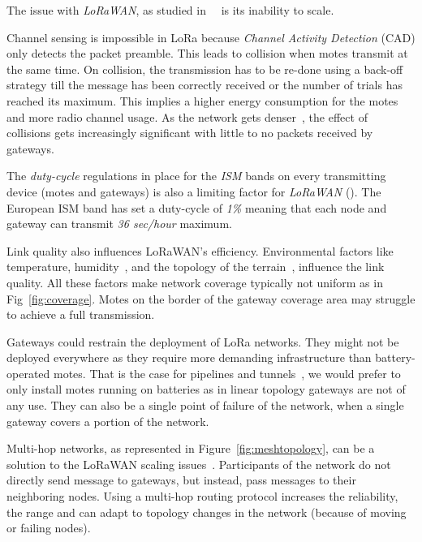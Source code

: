 

The issue with \emph{LoRaWAN}, as studied 
in~\cite{8030482}~\cite{10.1145/2988287.2989163} is its inability to scale. 

Channel sensing is impossible in LoRa because \emph{Channel Activity Detection}
(CAD) only detects the packet preamble. %
This leads to collision when motes transmit at the same time.
On collision, the transmission has to be re-done using a back-off strategy till the
message has been correctly received or the number of trials has reached its
maximum.
This implies a higher energy consumption for the motes and more radio 
channel usage.
As the network gets denser~\cite{8030482}, the effect of collisions gets
increasingly significant with little to no packets received by gateways.


The \emph{duty-cycle} regulations in place for the \emph{ISM} bands on every
transmitting device (motes and gateways) is also a limiting factor 
for \emph{LoRaWAN} (\cite{8030482}).
The European ISM band has set a duty-cycle of \emph{1\%} meaning that each node 
and gateway can transmit \emph{36 sec/hour} maximum. 


Link quality also influences LoRaWAN's efficiency. 
Environmental factors like temperature,
humidity~\cite{evaluation_of_the_reliability_of_lora}, and the topology of the
terrain~\cite{lorajambalaya}, influence the link quality.
All these factors make network coverage typically not uniform 
as in Fig~\ref{fig:coverage}.
Motes on the border of the gateway coverage area may struggle to
achieve a full transmission. 

Gateways could restrain the deployment of LoRa networks.
They might not be deployed everywhere as they require more demanding infrastructure 
than battery-operated motes.
That is the case for pipelines and tunnels~\cite{Abrardo_2019},
we would prefer to only install motes running on batteries as in linear
topology gateways are not of any use.
They can also be a single point of failure of the network, when a single
gateway covers a portion of the network. 



Multi-hop networks, as represented in Figure~\ref{fig:meshtopology}, can be a solution to
the LoRaWAN scaling issues~\cite{8115756}.
Participants of the network do not directly send message to gateways, but
instead, pass messages to their neighboring nodes.
Using a multi-hop routing protocol increases the reliability, the range
and can adapt to topology changes in the network (because of moving or failing nodes).

